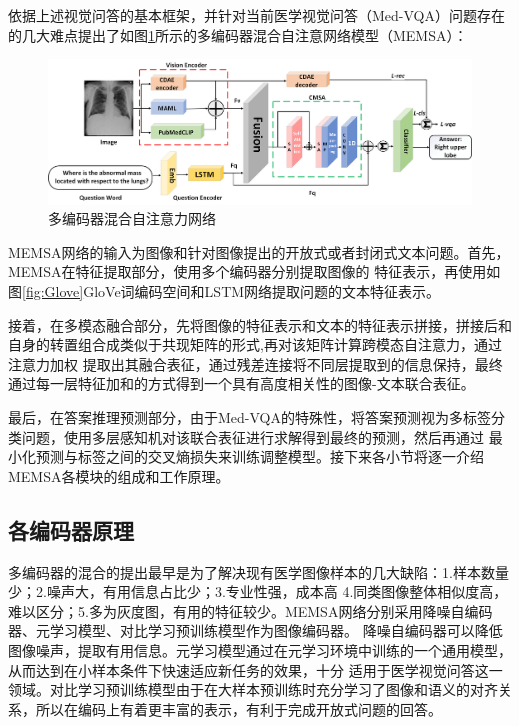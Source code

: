 依据上述视觉问答的基本框架，并针对当前医学视觉问答（Med-VQA）问题存在的几大难点提出了如图\ref{fig:memsa}所示的多编码器混合自注意网络模型（MEMSA）：
\begin{figure}[htbp]
	\centering	
	\includegraphics[width=1.1\textwidth]{Fig/myfig/chapter3/model_net2.png}  %
	\caption{\label{fig:memsa}多编码器混合自注意力网络} 
\end{figure}

MEMSA网络的输入为图像和针对图像提出的开放式或者封闭式文本问题。首先，MEMSA在特征提取部分，使用多个编码器分别提取图像的
特征表示，再使用如图\ref{fig:Glove}GloVe词编码空间和LSTM网络提取问题的文本特征表示。

接着，在多模态融合部分，先将图像的特征表示和文本的特征表示拼接，拼接后和自身的转置组合成类似于共现矩阵的形式,再对该矩阵计算跨模态自注意力，通过注意力加权
提取出其融合表征，通过残差连接将不同层提取到的信息保持，最终通过每一层特征加和的方式得到一个具有高度相关性的图像-文本联合表征。

最后，在答案推理预测部分，由于Med-VQA的特殊性，将答案预测视为多标签分类问题，使用多层感知机对该联合表征进行求解得到最终的预测，然后再通过
最小化预测与标签之间的交叉熵损失来训练调整模型。接下来各小节将逐一介绍MEMSA各模块的组成和工作原理。

\subsection{各编码器原理}
多编码器的混合的提出最早是为了解决现有医学图像样本的几大缺陷\cite{lin2021medical}：1.样本数量少；2.噪声大，有用信息占比少；3.专业性强，成本高
4.同类图像整体相似度高，难以区分；5.多为灰度图，有用的特征较少。MEMSA网络分别采用降噪自编码器、元学习模型、对比学习预训练模型作为图像编码器。
降噪自编码器可以降低图像噪声，提取有用信息。元学习模型通过在元学习环境中训练的一个通用模型，从而达到在小样本条件下快速适应新任务的效果，十分
适用于医学视觉问答这一领域。对比学习预训练模型由于在大样本预训练时充分学习了图像和语义的对齐关系，所以在编码上有着更丰富的表示，有利于完成开放式问题的回答。

